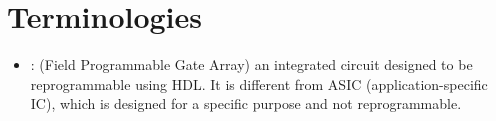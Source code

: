 \chapter{Terminologies}


\begin{itemize}
  \item {}: (Field Programmable Gate Array) an integrated circuit
    designed to be reprogrammable using HDL. It is different from ASIC
    (application-specific IC), which is designed for a specific purpose and
    not reprogrammable.
\end{itemize}
